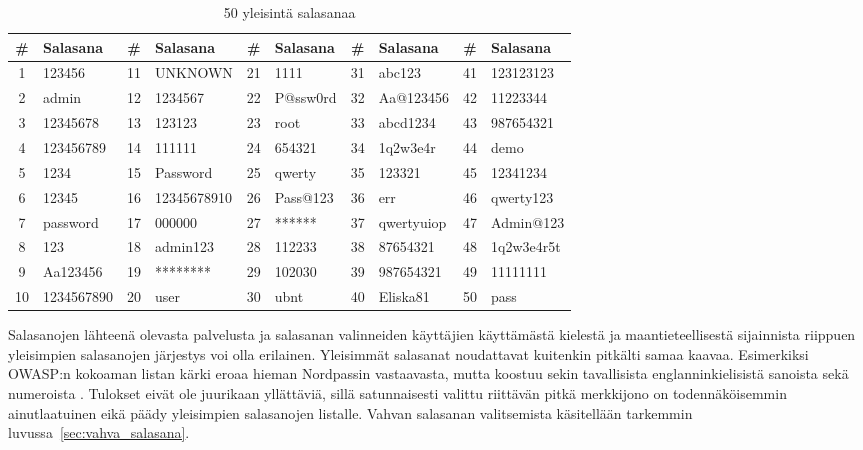 \begin{table}[ht]
    \centering
    \caption{50 yleisintä salasanaa \citep{nordpass_2023}\label{tab:yleiset_salasanat}}
    \begin{tabular}{ | c | l | c | l | c | l | c | l | c | l | }
        \hline
        \# & Salasana   & \# & Salasana    & \# & Salasana & \# & Salasana   & \# & Salasana   \\
        \hline
         1 & 123456     & 11 & UNKNOWN     & 21 & 1111     & 31 & abc123     & 41 & 123123123  \\
         2 & admin      & 12 & 1234567     & 22 & P@ssw0rd & 32 & Aa@123456  & 42 & 11223344   \\
         3 & 12345678   & 13 & 123123      & 23 & root     & 33 & abcd1234   & 43 & 987654321  \\
         4 & 123456789  & 14 & 111111      & 24 & 654321   & 34 & 1q2w3e4r   & 44 & demo       \\
         5 & 1234       & 15 & Password    & 25 & qwerty   & 35 & 123321     & 45 & 12341234   \\
         6 & 12345      & 16 & 12345678910 & 26 & Pass@123 & 36 & err        & 46 & qwerty123  \\
         7 & password   & 17 & 000000      & 27 & ******   & 37 & qwertyuiop & 47 & Admin@123  \\
         8 & 123        & 18 & admin123    & 28 & 112233   & 38 & 87654321   & 48 & 1q2w3e4r5t \\
         9 & Aa123456   & 19 & ********    & 29 & 102030   & 39 & 987654321  & 49 & 11111111   \\
        10 & 1234567890 & 20 & user        & 30 & ubnt     & 40 & Eliska81   & 50 & pass       \\
        \hline
    \end{tabular}
\end{table}

Salasanojen lähteenä olevasta palvelusta ja salasanan valinneiden käyttäjien käyttämästä kielestä ja maantieteellisestä sijainnista riippuen yleisimpien salasanojen järjestys voi olla erilainen. Yleisimmät salasanat noudattavat kuitenkin pitkälti samaa kaavaa. Esimerkiksi OWASP:n kokoaman listan kärki eroaa hieman Nordpassin vastaavasta, mutta koostuu sekin tavallisista englanninkielisistä sanoista sekä numeroista \citep{owasp_passwords_2017}. Tulokset eivät ole juurikaan yllättäviä, sillä satunnaisesti valittu riittävän pitkä merkkijono on todennäköisemmin ainutlaatuinen eikä päädy yleisimpien salasanojen listalle. Vahvan salasanan valitsemista käsitellään tarkemmin luvussa~\ref{sec:vahva_salasana}.

